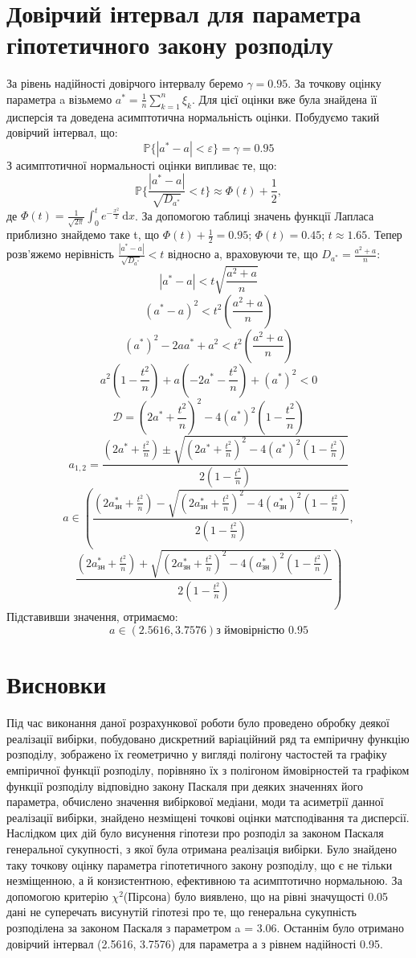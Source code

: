 \documentclass{article}
\begin{document}
\section{Довірчий інтервал для параметра гіпотетичного закону 
розподілу}
За рівень надійності довірчого інтервалу беремо $\gamma = 0.95$.
За точкову оцінку параметра a візьмемо $a^* = \frac{1}{n}
\sum_{k=1}^n \xi_k$. Для цієї оцінки вже була знайдена її дисперсія 
та доведена асимптотична нормальність оцінки. 
\newline
Побудуємо такий довірчий інтервал, що:
$$\mathbb{P} \{|a^* - a| < \varepsilon \} = \gamma = 0.95$$ 
З асимптотичної нормальності оцінки випливає те, що:
$$\mathbb{P}\{\frac{|a^* - a|}{\sqrt{D_{a^*}}} < t \} \approx 
\Phi(t) + \frac{1}{2},$$
де $\Phi(t) = \frac{1}{\sqrt{2\pi}}\int_{0}^{t} e^{-\frac{x^2}{2}} \,\mathrm{d}x $.
За допомогою таблиці значень функції Лапласа приблизно 
знайдемо таке t, що $\Phi(t) + \frac{1}{2} = 0.95$; $\Phi(t) = 0.45$;
$t \approx 1.65$.
\newline
Тепер розв'яжемо нерівність $\frac{|a^* - a|}{\sqrt{D_{a^*}}} < t$ 
відносно а, враховуючи те, що $D_{a^*} = \frac{a^2 + a}{n}$:
$$|a^* - a| < t\sqrt{\frac{a^2 + a}{n}}$$
$$(a^* - a)^2 < t^2(\frac{a^2 + a}{n})$$
$$(a^*)^2 - 2aa^* + a^2 < t^2(\frac{a^2 + a}{n})$$
$$a^2(1 - \frac{t^2}{n}) + a(-2a^* - \frac{t^2}{n}) + (a^*)^2 < 0$$
$$\mathcal{D} = (2a^* + \frac{t^2}{n})^2 - 4(a^*)^2(1 - \frac{t^2}{n})$$
$$a_{1,2} = \frac{(2a^* + \frac{t^2}{n}) \pm 
\sqrt{(2a^* + \frac{t^2}{n})^2 - 4(a^*)^2(1 - \frac{t^2}{n})}}
{2(1 - \frac{t^2}{n})}$$
$$a \in \left(\frac{(2a^*_{\text{зн}} + \frac{t^2}{n}) - 
\sqrt{(2a^*_{\text{зн}} + \frac{t^2}{n})^2 - 4(a^*_{\text{зн}})^2(1 - \frac{t^2}{n})}}
{2(1 - \frac{t^2}{n})}, \right.$$
$$\left.\frac{(2a^*_{\text{зн}} + \frac{t^2}{n}) + 
\sqrt{(2a^*_{\text{зн}} + \frac{t^2}{n})^2 - 4(a^*_{\text{зн}})^2(1 - \frac{t^2}{n})}}
{2(1 - \frac{t^2}{n})}\right)$$
Підставивши значення, отримаємо:
$$a \in \left(2.5616, 3.7576\right) \text{з ймовірністю }0.95$$
\newpage
\section{Висновки}
Під час виконання даної розрахункової роботи було проведено обробку 
деякої реалізації вибірки, побудовано дискретний варіаційний ряд 
та емпіричну функцію розподілу, зображено їх геометрично у вигляді 
полігону частостей та графіку емпіричної функції розподілу, 
порівняно їх з полігоном ймовірностей та графіком функції розподілу 
відповідно закону Паскаля при деяких значеннях його параметра, 
обчислено значення вибіркової медіани, моди та асиметрії данної 
реалізації вибірки, знайдено незміщені точкові оцінки матсподівання 
та дисперсії. Наслідком цих дій було висунення гіпотези про розподіл 
за законом Паскаля генеральної сукупності, з якої була отримана 
реалізація вибірки. Було знайдено таку точкову оцінку параметра 
гіпотетичного закону розподілу, що є не тільки незміщенною, а й 
конзистентною, ефективною та асимптотично нормальною. За допомогою критерію 
$\chi^2$(Пірсона) було виявлено, що на рівні значущості 0.05 дані не 
суперечать висунутій гіпотезі про те, що генеральна сукупність 
розподілена за законом Паскаля з параметром a = 3.06. Останнім було 
отримано довірчий інтервал (2.5616, 3.7576) для параметра а 
з рівнем надійності 0.95.
\end{document}

